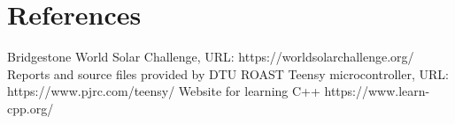 \documentclass[conference]{IEEEtran}
\begin{document}



\section{References}
\begingroup
\renewcommand{\section}[2]{}%
\begin{thebibliography}{}
Bridgestone World Solar Challenge, 
URL: https://worldsolarchallenge.org/
Reports and source files provided by DTU ROAST
Teensy microcontroller,
URL: https://www.pjrc.com/teensy/
Website for learning C++
https://www.learn-cpp.org/
\end{thebibliography}
\endgroup
\end{document}
